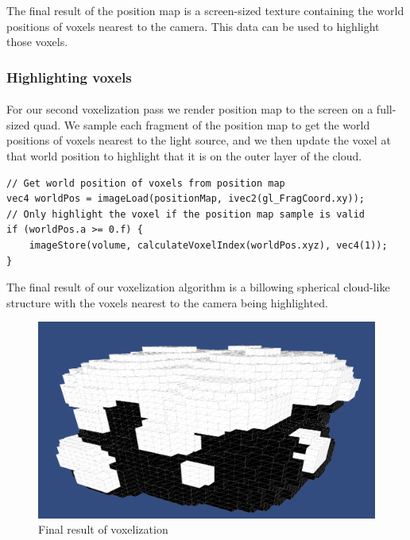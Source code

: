 The final result of the position map is a screen-sized texture containing the world positions of voxels nearest to the camera. This data can be used to highlight those voxels.

\subsubsection{Highlighting voxels}\paragraph{}
For our second voxelization pass we render position map to the screen on a full-sized quad. 
We sample each fragment of the position map to get the world positions of voxels nearest to the light source, and we then update the voxel at that world position to highlight that it is on the outer layer of the cloud. 

\begin{lstlisting}[caption={second\_voxelize.glsl, 34}]
// Get world position of voxels from position map
vec4 worldPos = imageLoad(positionMap, ivec2(gl_FragCoord.xy));
// Only highlight the voxel if the position map sample is valid
if (worldPos.a >= 0.f) {
    imageStore(volume, calculateVoxelIndex(worldPos.xyz), vec4(1));
}
\end{lstlisting}

%

The final result of our voxelization algorithm is a billowing spherical cloud-like structure with the voxels nearest to the camera being highlighted. 

\begin{figure}[h]
\centering
\includegraphics[width=\textwidth]{../res/billowing.png}
\caption{Final result of voxelization}
\end{figure}

